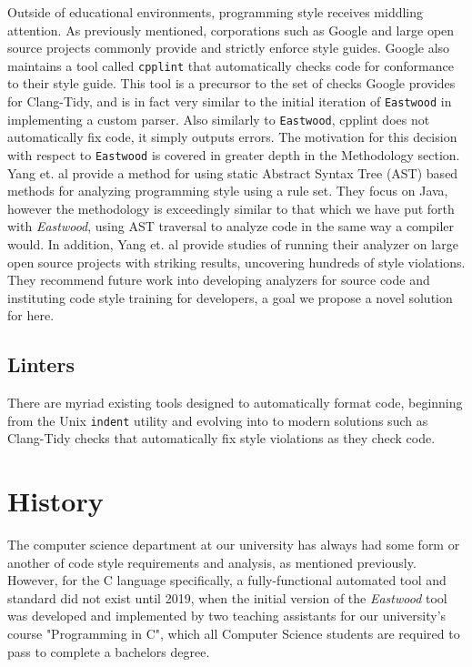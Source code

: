 \documentclass[sigconf]{acmart}
\begin{document}
Outside of educational environments, programming style receives middling attention.
As previously mentioned, corporations such as Google \cite{GoogleCStyleGuide} and large
open source projects commonly provide and strictly enforce style guides. Google also
maintains a tool called \texttt{cpplint} \cite{cpplint} that automatically checks code
for conformance to their style guide. This tool is a precursor to the set of checks
Google provides for Clang-Tidy, and is in fact very similar to the initial iteration of
\texttt{Eastwood} in implementing a custom parser. Also similarly to \texttt{Eastwood},
cpplint does not automatically fix code, it simply outputs errors. The motivation for
this decision with respect to \texttt{Eastwood} is covered in greater depth in the
Methodology section.
\\

Yang et. al provide a method for using static Abstract Syntax Tree (AST) based methods
for analyzing programming style using a rule set. They focus on Java, however the
methodology is exceedingly similar to that which we have put forth with
\textit{Eastwood}, using AST traversal to analyze code in the same way a compiler would.
In addition, Yang et. al provide studies of running their analyzer on large open source
projects with striking results, uncovering hundreds of style violations. They recommend
future work into developing analyzers for source code and instituting code style
training for developers, a goal we propose a novel solution for here.
\\

\subsection{Linters}

There are myriad existing tools designed to automatically format code, beginning from the
Unix \texttt{indent} utility and evolving into to modern solutions such as Clang-Tidy
checks that automatically fix style violations as they check code.
\\

\section{History}

The computer science department at our university has always had some form or another of
code style requirements and analysis, as mentioned previously. However, for the C
language specifically, a fully-functional automated tool and standard did not exist
until 2019, when the initial version of the \textit{Eastwood} tool was developed and
implemented by two teaching assistants for our university's course "Programming in C",
which all Computer Science students are required to pass to complete a bachelors degree.
\\
\end{document}
